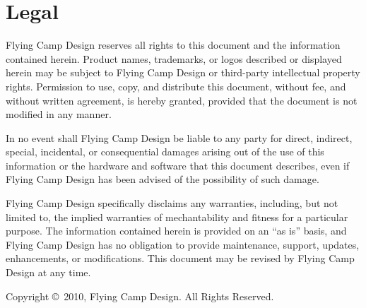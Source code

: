 \section*{\small{Legal}}

\begin{tiny}

Flying Camp Design reserves all rights to this document and the information
contained herein.  Product names, trademarks, or logos described or
displayed herein may be subject to Flying Camp Design or third-party
intellectual property rights.  Permission to use, copy, and distribute
this document, without fee, and without written agreement, is hereby
granted, provided that the document is not modified in any manner.

\vspace{1mm}
\noindent
In no event shall Flying Camp Design be liable to any party for direct,
indirect, special, incidental, or consequential damages arising out of
the use of this information or the hardware and software that this
document describes, even if Flying Camp Design has been advised of the
possibility of such damage.

\vspace{1mm}
\noindent
Flying Camp Design specifically disclaims any warranties, including, but not
limited to, the implied warranties of mechantability and fitness for a
particular purpose.  The information contained herein is provided on
an ``as is'' basis, and Flying Camp Design has no obligation to provide
maintenance, support, updates, enhancements, or modifications.  This
document may be revised by Flying Camp Design at any time.

\noindent
Copyright \copyright~2010, Flying Camp Design.  All Rights Reserved.
\end{tiny}
